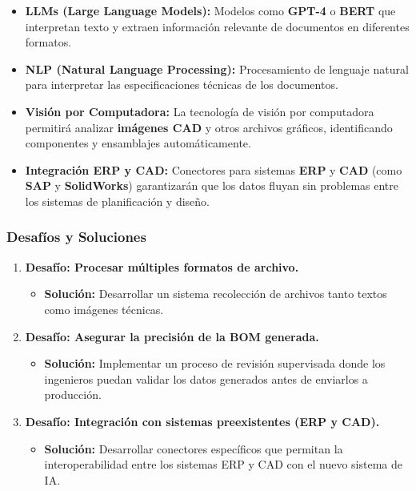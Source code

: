 \documentclass[
  10pt,
  letterpaper,
]{book}
\providecommand{\tightlist}{%
  \setlength{\itemsep}{0pt}\setlength{\parskip}{0pt}}\usepackage{longtable,booktabs,array}
\begin{document}
\begin{itemize}
\tightlist
\item
  \textbf{LLMs (Large Language Models):} Modelos como \textbf{GPT-4} o
  \textbf{BERT} que interpretan texto y extraen información relevante de
  documentos en diferentes formatos.
\item
  \textbf{NLP (Natural Language Processing):} Procesamiento de lenguaje
  natural para interpretar las especificaciones técnicas de los
  documentos.
\item
  \textbf{Visión por Computadora:} La tecnología de visión por
  computadora permitirá analizar \textbf{imágenes CAD} y otros archivos
  gráficos, identificando componentes y ensamblajes automáticamente.
\item
  \textbf{Integración ERP y CAD:} Conectores para sistemas \textbf{ERP}
  y \textbf{CAD} (como \textbf{SAP} y \textbf{SolidWorks}) garantizarán
  que los datos fluyan sin problemas entre los sistemas de planificación
  y diseño.
\end{itemize}

\subsubsection{Desafíos y Soluciones}\label{desafuxedos-y-soluciones}

\begin{enumerate}
\def\labelenumi{\arabic{enumi}.}
\tightlist
\item
  \textbf{Desafío: Procesar múltiples formatos de archivo.}

  \begin{itemize}
  \tightlist
  \item
    \textbf{Solución:} Desarrollar un sistema recolección de archivos
    tanto textos como imágenes técnicas.
  \end{itemize}
\item
  \textbf{Desafío: Asegurar la precisión de la BOM generada.}

  \begin{itemize}
  \tightlist
  \item
    \textbf{Solución:} Implementar un proceso de revisión supervisada
    donde los ingenieros puedan validar los datos generados antes de
    enviarlos a producción.
  \end{itemize}
\item
  \textbf{Desafío: Integración con sistemas preexistentes (ERP y CAD).}

  \begin{itemize}
  \tightlist
  \item
    \textbf{Solución:} Desarrollar conectores específicos que permitan
    la interoperabilidad entre los sistemas ERP y CAD con el nuevo
    sistema de IA.
  \end{itemize}
\end{enumerate}
\end{document}
